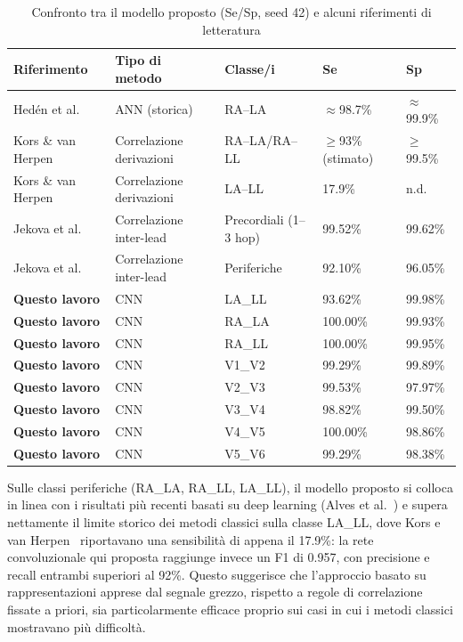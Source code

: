 \begin{table}[htbp]
	\centering
	\caption{Confronto tra il modello proposto (Se/Sp, seed 42) e alcuni riferimenti di letteratura}
	\label{tab:sota_confronto_sp_se}
	\scriptsize
	\begin{tabular}{p{3.2cm} p{2.4cm} p{2.2cm} p{1.4cm} p{1.4cm}}
		\toprule
		Riferimento & Tipo di metodo & Classe/i & Se & Sp \\
		\midrule
		Hedén et al. \cite{heden1995ann} & ANN (storica) & RA--LA & $\approx$98.7\% & $\approx$99.9\% \\
		Kors \& van Herpen \cite{kors2001accurate} & Correlazione derivazioni & RA--LA/RA--LL & $\geq$93\% (stimato) & $\geq$99.5\% \\
		Kors \& van Herpen \cite{kors2001accurate} & Correlazione derivazioni & LA--LL & 17.9\% & n.d. \\
		Jekova et al. \cite{jekova2016interlead} & Correlazione inter-lead & Precordiali (1--3 hop) & 99.52\% & 99.62\% \\
		Jekova et al. \cite{jekova2016interlead} & Correlazione inter-lead & Periferiche & 92.10\% & 96.05\% \\
		\midrule
		\textbf{Questo lavoro} & CNN & LA\_LL & 93.62\% & 99.98\% \\
		\textbf{Questo lavoro} & CNN & RA\_LA & 100.00\% & 99.93\% \\
		\textbf{Questo lavoro} & CNN & RA\_LL & 100.00\% & 99.95\% \\
		\textbf{Questo lavoro} & CNN & V1\_V2 & 99.29\% & 99.89\% \\
		\textbf{Questo lavoro} & CNN & V2\_V3 & 99.53\% & 97.97\% \\
		\textbf{Questo lavoro} & CNN & V3\_V4 & 98.82\% & 99.50\% \\
		\textbf{Questo lavoro} & CNN & V4\_V5 & 100.00\% & 98.86\% \\
		\textbf{Questo lavoro} & CNN & V5\_V6 & 99.29\% & 98.38\% \\
		\bottomrule
	\end{tabular}
\end{table}

\newpage
Sulle classi periferiche (RA\_LA, RA\_LL, LA\_LL), il modello proposto si colloca in linea con i risultati più recenti basati su deep learning (Alves et al.~\cite{alves2025telecardiology}) e supera nettamente il limite storico dei metodi classici sulla classe LA\_LL, dove Kors e van Herpen~\cite{kors2001accurate} riportavano una sensibilità di appena il 17.9\%: la rete convoluzionale qui proposta raggiunge invece un F1 di 0.957, con precisione e recall entrambi superiori al 92\%. Questo suggerisce che l'approccio basato su rappresentazioni apprese dal segnale grezzo, rispetto a regole di correlazione fissate a priori, sia particolarmente efficace proprio sui casi in cui i metodi classici mostravano più difficoltà.

